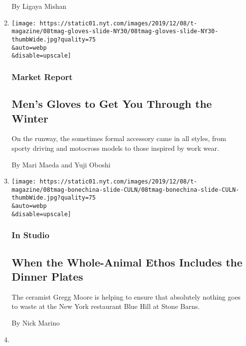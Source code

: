 \begin{enumerate}
  By Ligaya Mishan
\item
  \href{/2019/12/05/t-magazine/mens-gloves.html}{}

  \texttt{[image: https://static01.nyt.com/images/2019/12/08/t-magazine/08tmag-gloves-slide-NY30/08tmag-gloves-slide-NY30-thumbWide.jpg?quality=75\\\&auto=webp\\\&disable=upscale]}

  \hypertarget{market-report}{%
  \subsubsection{Market Report}\label{market-report}}

  \hypertarget{mens-gloves-to-get-you-through-the-winter}{%
  \subsection{Men's Gloves to Get You Through the
  Winter}\label{mens-gloves-to-get-you-through-the-winter}}

  On the runway, the sometimes formal accessory came in all styles, from
  sporty driving and motocross models to those inspired by work wear.

  By Mari Maeda and Yuji Oboshi
\item
  \href{/2019/12/05/t-magazine/blue-hill-gregg-moore-ceramics.html}{}

  \texttt{[image: https://static01.nyt.com/images/2019/12/08/t-magazine/08tmag-bonechina-slide-CULN/08tmag-bonechina-slide-CULN-thumbWide.jpg?quality=75\\\&auto=webp\\\&disable=upscale]}

  \hypertarget{in-studio}{%
  \subsubsection{In Studio}\label{in-studio}}

  \hypertarget{when-the-whole-animal-ethos-includes-the-dinner-plates}{%
  \subsection{When the Whole-Animal Ethos Includes the Dinner
  Plates}\label{when-the-whole-animal-ethos-includes-the-dinner-plates}}

  The ceramist Gregg Moore is helping to ensure that absolutely nothing
  goes to waste at the New York restaurant Blue Hill at Stone Barns.

  By Nick Marino
\item
  \href{/2019/12/04/t-magazine/park-hyatt-kyoto.html}{}


\end{enumerate}
